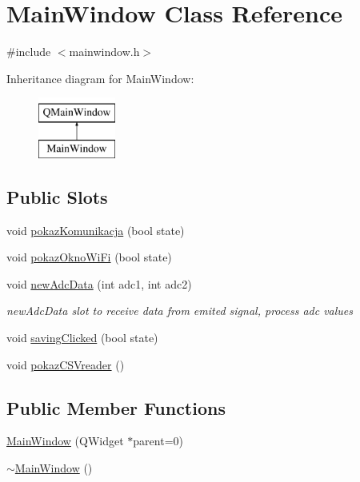 \hypertarget{class_main_window}{}\section{Main\+Window Class Reference}
\label{class_main_window}


{\ttfamily \#include $<$mainwindow.\+h$>$}

Inheritance diagram for Main\+Window\+:\begin{figure}[H]
\begin{center}
\leavevmode
\includegraphics[height=2.000000cm]{class_main_window}
\end{center}
\end{figure}
\subsection*{Public Slots}
\begin{DoxyCompactItemize}
\item 
void \hyperlink{class_main_window_a0f0b8e878849a65e6c5b2405fe22f26e}{pokaz\+Komunikacja} (bool state)
\item 
void \hyperlink{class_main_window_a84238e487942aac887ca4702844ed26e}{pokaz\+Okno\+Wi\+Fi} (bool state)
\item 
void \hyperlink{class_main_window_ab12446607d3535de4c195ce03d2c62c1}{new\+Adc\+Data} (int adc1, int adc2)
\begin{DoxyCompactList}\small\item\em new\+Adc\+Data slot to receive data from emited signal, process adc values \end{DoxyCompactList}\item 
void \hyperlink{class_main_window_a02844dac36eef12a555efacba15722e3}{saving\+Clicked} (bool state)
\item 
void \hyperlink{class_main_window_a67bd4592c9f76e24a3e2398a6d362c5d}{pokaz\+C\+S\+Vreader} ()
\end{DoxyCompactItemize}
\subsection*{Public Member Functions}
\begin{DoxyCompactItemize}
\item 
\hyperlink{class_main_window_a8b244be8b7b7db1b08de2a2acb9409db}{Main\+Window} (Q\+Widget $\ast$parent=0)
\item 
\hyperlink{class_main_window_ae98d00a93bc118200eeef9f9bba1dba7}{$\sim$\+Main\+Window} ()
\end{DoxyCompactItemize}


